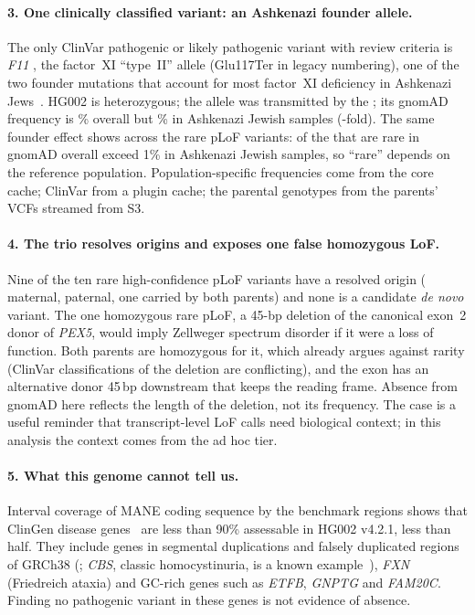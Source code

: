 \paragraph{3. One clinically classified variant: an Ashkenazi founder
allele.} The only ClinVar pathogenic or likely pathogenic variant with
review criteria is \textit{F11} \PlpHgvsp{}, the factor~XI ``type~II''
allele (Glu117Ter in legacy numbering), one of the two founder mutations
that account for most factor~XI deficiency in Ashkenazi
Jews~\cite{asakai1991}. HG002 is heterozygous; the allele was transmitted
by the \PlpParent{}; its gnomAD frequency is \PlpAf\% overall but \PlpAsj\%
in Ashkenazi Jewish samples (\PlpFold-fold). The same founder effect shows
across the rare pLoF variants: \NRareAsjCommon{} of the \NHcRare{} that are
rare in gnomAD overall exceed 1\% in Ashkenazi Jewish samples, so
``rare'' depends on the reference population. Population-specific
frequencies come from the core cache; ClinVar from a plugin cache; the
parental genotypes from the parents' VCFs streamed from S3.

\paragraph{4. The trio resolves origins and exposes one false homozygous
LoF.} Nine of the ten rare high-confidence pLoF variants have a resolved
origin (\NRareMaternal{} maternal, \NRarePaternal{} paternal, one carried by
both parents) and none is a candidate \emph{de novo} variant. The one
homozygous rare pLoF, a 45-bp deletion of the canonical exon~2 donor of
\textit{PEX5}, would imply Zellweger spectrum disorder if it were a loss of
function. Both parents are homozygous for it, which already argues against
rarity (ClinVar classifications of the deletion are conflicting), and the exon has an alternative donor 45\,bp downstream that keeps
the reading frame. Absence from gnomAD here reflects the length of the
deletion, not its frequency. The case is a useful reminder that
transcript-level LoF calls need biological context; in this analysis the
context comes from the ad hoc tier.

\paragraph{5. What this genome cannot tell us.} Interval coverage of MANE
coding sequence by the benchmark regions shows that \NClinGenLtNinety{}
ClinGen disease genes~\cite{strande2017} are less than 90\% assessable in
HG002 v4.2.1, \NClinGenLtFifty{} less than half. They include genes in
segmental duplications and falsely duplicated regions of GRCh38
(\ClinGenFalseDup{}; \textit{CBS}, classic homocystinuria, is a known
example~\cite{aganezov2022}), \textit{FXN} (Friedreich ataxia) and GC-rich
genes such as \textit{ETFB}, \textit{GNPTG} and \textit{FAM20C}. Finding no
pathogenic variant in these genes is not evidence of absence.

